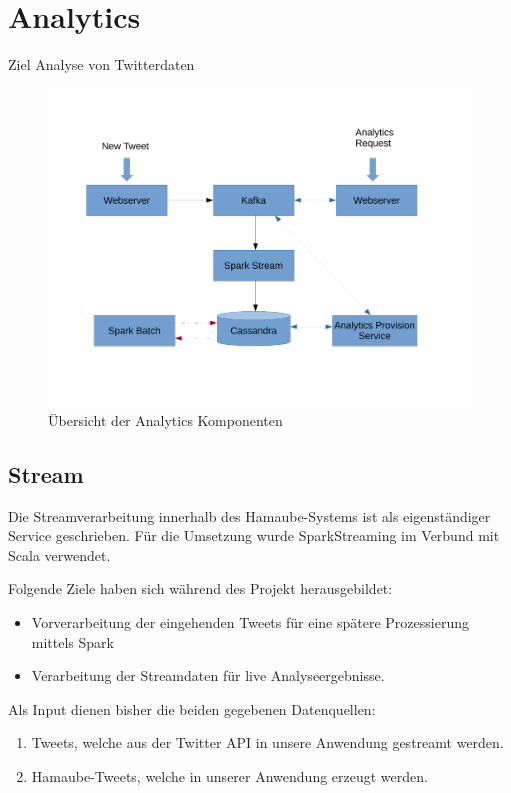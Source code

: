 

\chapter{Analytics}
\label{Analytics}

Ziel  Analyse von Twitterdaten



\begin{figure}[htbp!]
	\centering
	\includegraphics[width=\textwidth]{pics/analytics/archi}
	\caption{Übersicht der Analytics Komponenten}
\end{figure}

\section{Stream}

Die Streamverarbeitung innerhalb des Hamaube-Systems ist als eigenständiger Service geschrieben. Für die Umsetzung wurde SparkStreaming im Verbund mit Scala verwendet.

Folgende Ziele haben sich während des Projekt herausgebildet:
\begin{itemize}
	\item Vorverarbeitung der eingehenden Tweets für eine spätere Prozessierung mittels Spark
	\item Verarbeitung der Streamdaten für live Analyseergebnisse.
\end{itemize}


Als Input dienen bisher die beiden gegebenen Datenquellen:
\begin{enumerate}
	\item Tweets, welche aus der Twitter API in unsere Anwendung gestreamt werden.
	\item Hamaube-Tweets, welche in unserer Anwendung erzeugt werden.
\end{enumerate}

